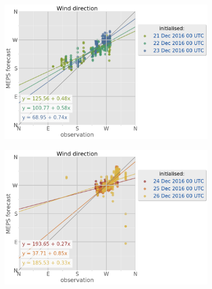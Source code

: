 \begin{figure}
	\begin{subfigure}[b]{0.49\textwidth}
		\includegraphics[trim={0.cm 0cm 12.5cm 0cm},clip,
		width=\textwidth]{./fig_sfc_wd/obs_model_20161221_23_00}
		\caption{}\label{fig:scat:wd2123}
	\end{subfigure}
	\begin{subfigure}[b]{0.49\textwidth}
		\includegraphics[trim={0.cm 0cm 12.5cm 0cm},clip,
		width=\textwidth]{./fig_sfc_wd/obs_model_20161224_26_00}
		\caption{}\label{fig:scat:wd2426}
	\end{subfigure}
    	

\end{figure}
